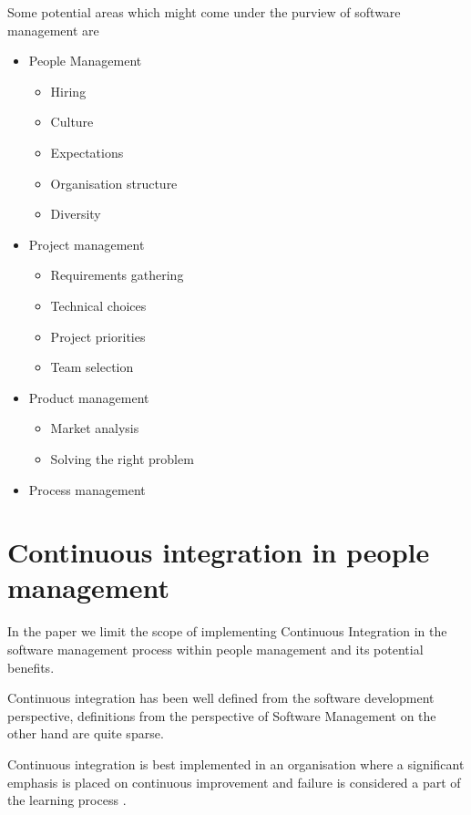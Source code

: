 \documentclass[12pt,conference]{IEEEtran}
\begin{document}
Some potential areas which might come under the purview of software management are

\begin{itemize}

\item People Management
\begin{itemize}
\item Hiring
\item Culture
\item Expectations
\item Organisation structure
\item Diversity
\end{itemize}

\item Project management
\begin{itemize}
\item Requirements gathering
\item Technical choices
\item Project priorities
\item Team selection
\end{itemize}

\item Product management
\begin{itemize}
\item Market analysis
\item Solving the right problem
\end{itemize}

\item Process management
\end{itemize}


\section*{Continuous integration in people management}

In the paper we limit the scope of implementing Continuous Integration in the software management process within people management and its potential benefits.

Continuous integration has been well defined from the software development perspective, definitions from the perspective of Software Management on the other hand are quite sparse. 

Continuous integration is best implemented in an organisation where a significant emphasis is placed on continuous improvement and failure is considered a part of the learning process \cite{edmondson_strategies_2011}.
\end{document}
